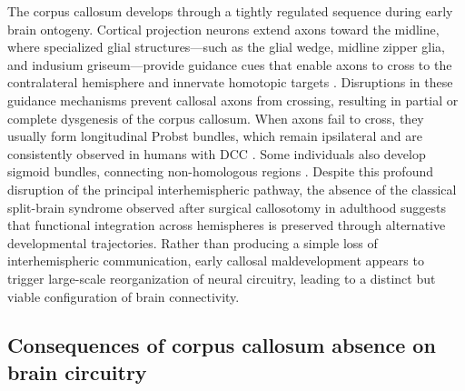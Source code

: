 \documentclass{article}
\begin{document}
The corpus callosum develops through a tightly regulated sequence during early brain ontogeny. Cortical projection neurons extend axons toward the midline, where specialized glial structures—such as the glial wedge, midline zipper glia, and indusium griseum—provide guidance cues that enable axons to cross to the contralateral hemisphere and innervate homotopic targets \citep{Tovarmoll2007,Paul2012}. Disruptions in these guidance mechanisms prevent callosal axons from crossing, resulting in partial or complete dysgenesis of the corpus callosum. When axons fail to cross, they usually form longitudinal Probst bundles, which remain ipsilateral and are consistently observed in humans with DCC \citep{Tovarmoll2007,Lazarev2016}. Some individuals also develop sigmoid bundles, connecting non-homologous regions \citep{Tovarmoll2007}. Despite this profound disruption of the principal interhemispheric pathway, the absence of the classical split-brain syndrome observed after surgical callosotomy in adulthood suggests that functional integration across hemispheres is preserved through alternative developmental trajectories. Rather than producing a simple loss of interhemispheric communication, early callosal maldevelopment appears to trigger large-scale reorganization of neural circuitry, leading to a distinct but viable configuration of brain connectivity.

\subsection{Consequences of corpus callosum absence on brain circuitry}
\end{document}
